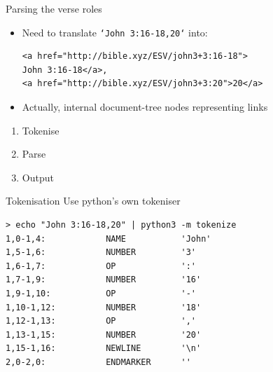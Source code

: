 \documentclass{beamer}
\begin{document}
\begin{frame}[fragile]{Parsing the verse roles}
\begin{itemize}
\item Need to translate \texttt{`John 3:16-18,20`} into:

\begin{verbatim}
<a href="http://bible.xyz/ESV/john3+3:16-18">
John 3:16-18</a>,
<a href="http://bible.xyz/ESV/john3+3:20">20</a>
\end{verbatim}

\item Actually, internal document-tree nodes representing links
\end{itemize}

\begin{enumerate}
\item Tokenise
\item Parse
\item Output
\end{enumerate}
\end{frame}

\begin{frame}[fragile]{Tokenisation}
Use python's own tokeniser

\begin{verbatim}
> echo "John 3:16-18,20" | python3 -m tokenize
1,0-1,4:            NAME           'John'         
1,5-1,6:            NUMBER         '3'            
1,6-1,7:            OP             ':'            
1,7-1,9:            NUMBER         '16'           
1,9-1,10:           OP             '-'            
1,10-1,12:          NUMBER         '18'           
1,12-1,13:          OP             ','            
1,13-1,15:          NUMBER         '20'           
1,15-1,16:          NEWLINE        '\n'           
2,0-2,0:            ENDMARKER      ''             
\end{verbatim}

\end{frame}
\end{document}

